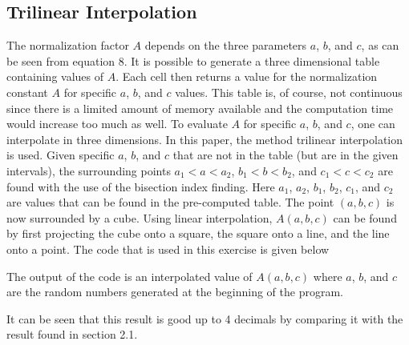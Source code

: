 \subsection{Trilinear Interpolation}

The normalization factor $A$ depends on the three parameters $a$, $b$, and $c$, as can be seen from equation 8. It is possible to generate a three dimensional table containing values of $A$. Each cell then returns a value for the normalization constant $A$ for specific $a$, $b$, and $c$ values. This table is, of course, not continuous since there is a limited amount of memory available and the computation time would increase too much as well. To evaluate $A$ for specific $a$, $b$, and $c$, one can interpolate in three dimensions. In this paper, the method trilinear interpolation is used. Given specific $a$, $b$, and $c$ that are not in the table (but are in the given intervals), the surrounding points $a_1 < a < a_2$, $b_1 < b < b_2$, and $c_1 < c < c_2$ are found with the use of the bisection index finding. Here $a_1$, $a_2$, $b_1$, $b_2$, $c_1$, and $c_2$ are values that can be found in the pre-computed table. The point $(a,b,c)$ is now surrounded by a cube. Using linear interpolation, $A(a,b,c)$ can be found by first projecting the cube onto a square, the square onto a line, and the line onto a point. %
The code that is used in this exercise is given below




The output of the code is an interpolated value of $A(a,b,c)$ where $a$, $b$, and $c$ are the random numbers generated at the beginning of the program.



It can be seen that this result is good up to 4 decimals by comparing it with the result found in section 2.1.